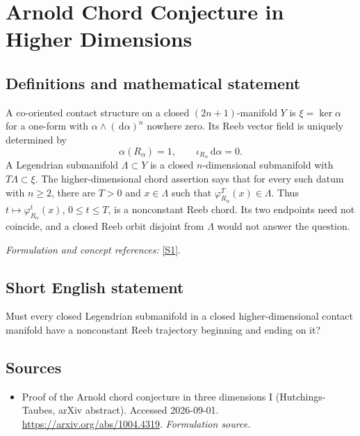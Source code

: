 \documentclass[11pt]{article}
\begin{document}
\section*{\texorpdfstring{Arnold Chord Conjecture in Higher Dimensions}{Arnold Chord Conjecture in Higher Dimensions}}\label{30006865}
\subsection{Definitions and mathematical statement}
A co-oriented contact structure on a closed $(2n+1)$-manifold $Y$ is $\xi=\ker\alpha$ for a one-form with $\alpha\wedge({\,\mathrm{d}}\alpha)^n$ nowhere zero. Its Reeb vector field is uniquely determined by
\[
 \alpha(R_\alpha)=1,\qquad \iota_{R_\alpha}{\,\mathrm{d}}\alpha=0.
\]
A Legendrian submanifold $\Lambda\subset Y$ is a closed $n$-dimensional submanifold with $T\Lambda\subset\xi$. The higher-dimensional chord assertion says that for every such datum with $n\ge2$, there are $T>0$ and $x\in\Lambda$ such that $\varphi_{R_\alpha}^T(x)\in\Lambda$. Thus $t\mapsto\varphi_{R_\alpha}^t(x)$, $0\le t\le T$, is a nonconstant Reeb chord. Its two endpoints need not coincide, and a closed Reeb orbit disjoint from $\Lambda$ would not answer the question.
\par\smallskip\textit{Formulation and concept references:} \href{https://arxiv.org/abs/1004.4319}{[S1]}.

\subsection{Short English statement}
Must every closed Legendrian submanifold in a closed higher-dimensional contact manifold have a nonconstant Reeb trajectory beginning and ending on it?
\subsection{Sources}
\begin{itemize}
\item[S1]Proof of the Arnold chord conjecture in three dimensions I (Hutchings-Taubes, arXiv abstract). Accessed 2026-09-01.
\url{https://arxiv.org/abs/1004.4319}.
\textit{Formulation source.}
\end{itemize}
\end{document}

